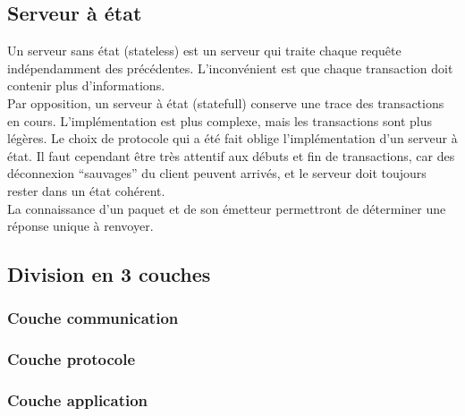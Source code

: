 \documentclass[10pt,a4paper]{article}
\begin{document}
\subsection{Serveur à état} \label{sec:etat}
Un serveur sans état (stateless) est un serveur qui traite chaque requête indépendamment des précédentes. L'inconvénient est que chaque transaction doit contenir plus d'informations.\\
Par opposition, un serveur à état (statefull) conserve une trace des transactions en cours. L'implémentation est plus complexe, mais les transactions sont plus légères. Le choix de protocole qui a été fait oblige l'implémentation d'un serveur à état. Il faut cependant être très attentif aux débuts et fin de transactions, car des déconnexion ``sauvages'' du client peuvent arrivés, et le serveur doit toujours rester dans un état cohérent.\\

La connaissance d'un paquet et de son émetteur permettront de déterminer une réponse unique à renvoyer. 
\subsection{Division en 3 couches}

\subsubsection{Couche communication} \label{sec:communication}
\subsubsection{Couche protocole}
\subsubsection{Couche application}
\end{document}
